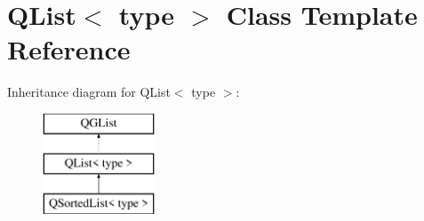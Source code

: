 \hypertarget{class_q_list}{}\section{Q\+List$<$ type $>$ Class Template Reference}
\label{class_q_list}
Inheritance diagram for Q\+List$<$ type $>$\+:\begin{figure}[H]
\begin{center}
\leavevmode
\includegraphics[height=3.000000cm]{class_q_list}
\end{center}
\end{figure}
